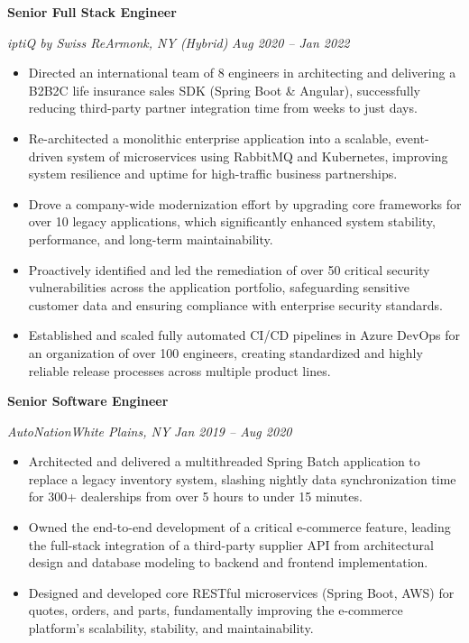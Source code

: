 \documentclass[11pt,letterpaper]{article}
\newlength{\spacingBetweenJobs}          \setlength{\spacingBetweenJobs}{10pt}
\newlength{\spacingAfterJobHeader}       \setlength{\spacingAfterJobHeader}{0.8em}
\newcommand{\jobtitle}[4]{%
  \noindent%
  {\bfseries\large #1}\par%
  \vspace{0.2em}%
  \textcolor{colorSubtle}{%
    \textit{#2\enspace\textbullet\enspace#3}%
    \hfill%
    \textit{\small #4}%
  }\par%
  \vspace{\spacingAfterJobHeader}%
}
\begin{document}
\pagebreak 

\jobtitle{Senior Full Stack Engineer}{iptiQ by Swiss Re}{Armonk, NY (Hybrid)}{Aug 2020 -- Jan 2022}
\begin{itemize}
  \item Directed an international team of 8 engineers in architecting and delivering a B2B2C life insurance sales SDK (Spring Boot \& Angular), successfully reducing third-party partner integration time from weeks to just days.
  \item Re-architected a monolithic enterprise application into a scalable, event-driven system of microservices using RabbitMQ and Kubernetes, improving system resilience and uptime for high-traffic business partnerships.
  \item Drove a company-wide modernization effort by upgrading core frameworks for over 10 legacy applications, which significantly enhanced system stability, performance, and long-term maintainability.
  \item Proactively identified and led the remediation of over 50 critical security vulnerabilities across the application portfolio, safeguarding sensitive customer data and ensuring compliance with enterprise security standards.
  \item Established and scaled fully automated CI/CD pipelines in Azure DevOps for an organization of over 100 engineers, creating standardized and highly reliable release processes across multiple product lines.
\end{itemize}
\vspace{\spacingBetweenJobs}

\jobtitle{Senior Software Engineer}{AutoNation}{White Plains, NY}{Jan 2019 -- Aug 2020}
\begin{itemize}
  \item Architected and delivered a multithreaded Spring Batch application to replace a legacy inventory system, slashing nightly data synchronization time for 300+ dealerships from over 5 hours to under 15 minutes.
  \item Owned the end-to-end development of a critical e-commerce feature, leading the full-stack integration of a third-party supplier API from architectural design and database modeling to backend and frontend implementation.
  \item Designed and developed core RESTful microservices (Spring Boot, AWS) for quotes, orders, and parts, fundamentally improving the e-commerce platform's scalability, stability, and maintainability.
\end{itemize}
\vspace{\spacingBetweenJobs}
\end{document}
